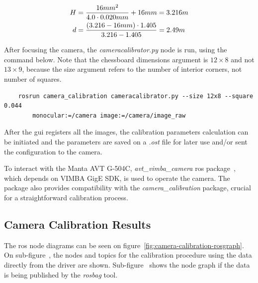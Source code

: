 \begin{subequations}
	\label{eq:hyperfocal-and-dof-values}
	\begin{align}
		H & = \frac{16mm^2}{4.0 \cdot 0.020mm} + 16mm  = 3.216 m \label{eq:hyperfocal-distance-value} \\
		\vspace{25mm}
		d & = \frac{(3.216 - 16mm) \cdot 1.405}{3.216 - 1.405} = 2.49m \label{eq:dof-subject-distance-value}
	\end{align}
\end{subequations}

After focusing the camera, the \emph{cameracalibrator.py} node is run, using the command below. Note that the chessboard dimensions argument is $12\times 8$ and not $13 \times 9$, because the size argument refers to the number of interior corners, not number of squares.


\begin{verbatim}
    rosrun camera_calibration cameracalibrator.py --size 12x8 --square 0.044  
        monocular:=/camera image:=/camera/image_raw
\end{verbatim}


After the \ac{gui} registers all the images, the calibration parameters calculation can be initiated and the parameters are saved on a \textit{.ost} file for later use and/or sent the configuration to the camera. 

To interact with the Manta AVT G-504C, \emph{avt\_vimba\_camera} \ac{ros} package~\cite{AVTROSdriver}, which depends on VIMBA GigE SDK, is used to operate the camera. The package also provides compatibility with the \emph{camera\_calibration} package, crucial for a straightforward calibration process.

\subsection{Camera Calibration Results}
The \ac{ros} node diagrams can be seen on figure~\ref{fig:camera-calibration-rosgraph}. On sub-figure~, the nodes and topics for the calibration procedure using the data directly from the driver are shown. Sub-figure~ shows the node graph if the data is being published by the \emph{rosbag} tool.



